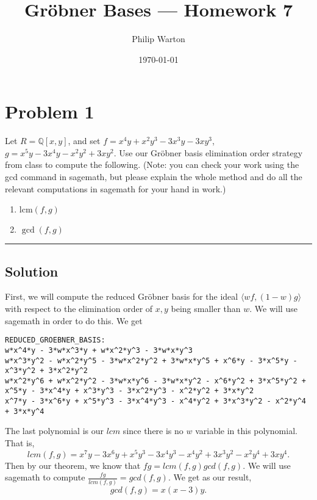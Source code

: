 \documentclass{article}
\theoremstyle{definition}
\begin{document}
\title{Gr{\"o}bner Bases --- Homework 7}
\author{Philip Warton}
\date{\today}
\maketitle
\section*{Problem 1}
Let $R=\mathbb{Q}[x,y]$, and set $f=x^4y + x^2y^3 - 3x^3y - 3xy^3$, $g=x^5y - 3x^4y - 
x^2y^2 + 3xy^2$.  Use our Gr\"obner basis elimination order strategy from class to 
compute the following.  (Note: you can check your work using the gcd command in 
sagemath, but please explain the whole method and do all the relevant computations 
in sagemath for your hand in work.)
\begin{enumerate}
\item
$\text{lcm}(f,g)$
\item
$\gcd(f,g)$
\end{enumerate}
\par\noindent\rule{\textwidth}{0.4pt}
\subsection*{Solution}
First, we will compute the reduced Gr{\"o}bner basis for the ideal $\langle wf,(1-w)g \rangle$ with respect to the elimination order of $x,y$
being smaller than $w$. We will use sagemath in order to do this. We get 
\begin{verbatim}
REDUCED_GROEBNER_BASIS:
w*x^4*y - 3*w*x^3*y + w*x^2*y^3 - 3*w*x*y^3
w*x^3*y^2 - w*x^2*y^5 - 3*w*x^2*y^2 + 3*w*x*y^5 + x^6*y - 3*x^5*y - x^3*y^2 + 3*x^2*y^2
w*x^2*y^6 + w*x^2*y^2 - 3*w*x*y^6 - 3*w*x*y^2 - x^6*y^2 + 3*x^5*y^2 + x^5*y - 3*x^4*y + x^3*y^3 - 3*x^2*y^3 - x^2*y^2 + 3*x*y^2
x^7*y - 3*x^6*y + x^5*y^3 - 3*x^4*y^3 - x^4*y^2 + 3*x^3*y^2 - x^2*y^4 + 3*x*y^4
\end{verbatim}
The last polynomial is our $lcm$ since there is no $w$ variable in this polynomial. That is,
\[
    lcm(f,g)=x^7  y - 3  x^6  y + x^5  y^3 - 3  x^4  y^3 - x^4  y^2 + 3  x^3  y^2 - x^2  y^4 + 3  x  y^4
.\]
Then by our theorem, we know that $fg = lcm(f,g)gcd(f,g)$. We will use sagemath to compute $\frac{fg}{lcm(f,g)} = gcd(f,g)$.
We get as our result,
\[
    gcd(f,g)=x(x-3)y  
.\]
\end{document}
